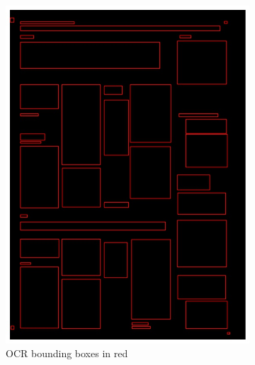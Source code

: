 \documentclass[oneside, english, bibtex]{kththesis}
\begin{document}
\begin{figure}[!htb]
\begin{adjustbox}{center,max size={\textwidth}{0.9\textheight}}
\parbox{1.5\textwidth}{\lineskip=0pt
\begin{subfigure}{0.6\textwidth}
  \centering
  \includegraphics[width=\linewidth, clip=true, trim = 0mm 0mm 0mm 0mm]{figures/ocr/AVThDFz.jpg}
  \caption{OCR bounding boxes in red}
  \label{fig:AVThDFz_OCR}
\end{subfigure}%
\begin{subfigure}{0.6\textwidth}
  \centering

\end{subfigure}}
\end{adjustbox}
\end{figure}
\end{document}
